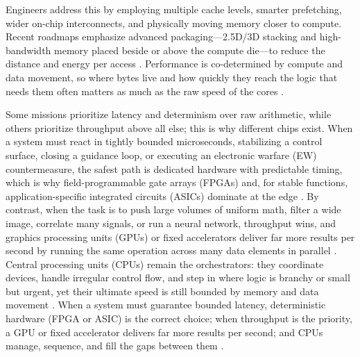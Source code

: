 Engineers address this by employing multiple cache levels, smarter prefetching, wider on-chip interconnects, and physically moving memory closer to compute. Recent roadmaps emphasize advanced packaging---2.5D/3D stacking and high-bandwidth memory placed beside or above the compute die---to reduce the distance and energy per access \parencite{ieee_electronics_packaging_society_heterogeneous_2024}. Performance is co-determined by compute and data movement, so where bytes live and how quickly they reach the logic that needs them often matters as much as the raw speed of the cores \parencite{jacob_memory_2008,patterson_computer_2018}.

Some missions prioritize latency and determinism over raw arithmetic, while others prioritize throughput above all else; this is why different chips exist. When a system must react in tightly bounded microseconds, stabilizing a control surface, closing a guidance loop, or executing an electronic warfare (EW) countermeasure, the safest path is dedicated hardware with predictable timing, which is why field-programmable gate arrays (FPGAs) and, for stable functions, application-specific integrated circuits (ASICs) dominate at the edge \parencite{shivakumar_semiconductors_2022,kuon_measuring_2006}. By contrast, when the task is to push large volumes of uniform math, filter a wide image, correlate many signals, or run a neural network, throughput wins, and graphics processing units (GPUs) or fixed accelerators deliver far more results per second by running the same operation across many data elements in parallel \parencite{nickolls_scalable_2008}. Central processing units (CPUs) remain the orchestrators: they coordinate devices, handle irregular control flow, and step in where logic is branchy or small but urgent, yet their ultimate speed is still bounded by memory and data movement \parencite{patterson_computer_2018,jacob_memory_2008}. When a system must guarantee bounded latency, deterministic hardware (FPGA or ASIC) is the correct choice; when throughput is the priority, a GPU or fixed accelerator delivers far more results per second; and CPUs manage, sequence, and fill the gaps between them \parencite{hauck_reconfigurable_2008,kuon_measuring_2006,nickolls_gpu_2010}.

